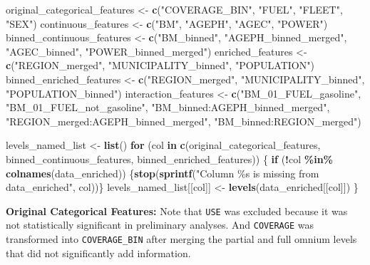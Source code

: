 \documentclass[
  english,
  11pt,
]{article}
\newenvironment{Shaded}{\begin{snugshade}}{\end{snugshade}}
\newcommand{\ControlFlowTok}[1]{\textcolor[rgb]{0.13,0.29,0.53}{\textbf{#1}}}
\newcommand{\FunctionTok}[1]{\textcolor[rgb]{0.13,0.29,0.53}{\textbf{#1}}}
\newcommand{\NormalTok}[1]{#1}
\newcommand{\OtherTok}[1]{\textcolor[rgb]{0.56,0.35,0.01}{#1}}
\newcommand{\SpecialCharTok}[1]{\textcolor[rgb]{0.81,0.36,0.00}{\textbf{#1}}}
\newcommand{\StringTok}[1]{\textcolor[rgb]{0.31,0.60,0.02}{#1}}
\begin{document}
\begin{Shaded}
\begin{Highlighting}[]
\NormalTok{original\_categorical\_features }\OtherTok{\textless{}{-}} \FunctionTok{c}\NormalTok{(}\StringTok{"COVERAGE\_BIN"}\NormalTok{, }\StringTok{"FUEL"}\NormalTok{, }\StringTok{"FLEET"}\NormalTok{, }\StringTok{"SEX"}\NormalTok{)}
\NormalTok{continuous\_features }\OtherTok{\textless{}{-}} \FunctionTok{c}\NormalTok{(}\StringTok{"BM"}\NormalTok{, }\StringTok{"AGEPH"}\NormalTok{, }\StringTok{"AGEC"}\NormalTok{, }\StringTok{"POWER"}\NormalTok{)}
\NormalTok{binned\_continuous\_features }\OtherTok{\textless{}{-}} \FunctionTok{c}\NormalTok{(}\StringTok{"BM\_binned"}\NormalTok{, }\StringTok{"AGEPH\_binned\_merged"}\NormalTok{, }\StringTok{"AGEC\_binned"}\NormalTok{, }\StringTok{"POWER\_binned\_merged"}\NormalTok{)}
\NormalTok{enriched\_features }\OtherTok{\textless{}{-}} \FunctionTok{c}\NormalTok{(}\StringTok{"REGION\_merged"}\NormalTok{, }\StringTok{"MUNICIPALITY\_binned"}\NormalTok{, }\StringTok{"POPULATION"}\NormalTok{)}
\NormalTok{binned\_enriched\_features }\OtherTok{\textless{}{-}} \FunctionTok{c}\NormalTok{(}\StringTok{"REGION\_merged"}\NormalTok{, }\StringTok{"MUNICIPALITY\_binned"}\NormalTok{, }\StringTok{"POPULATION\_binned"}\NormalTok{)}
\NormalTok{interaction\_features }\OtherTok{\textless{}{-}} \FunctionTok{c}\NormalTok{(}\StringTok{"BM\_01\_FUEL\_gasoline"}\NormalTok{, }\StringTok{"BM\_01\_FUEL\_not\_gasoline"}\NormalTok{, }\StringTok{"BM\_binned:AGEPH\_binned\_merged"}\NormalTok{, }\StringTok{"REGION\_merged:AGEPH\_binned\_merged"}\NormalTok{, }\StringTok{"BM\_binned:REGION\_merged"}\NormalTok{)}

\NormalTok{levels\_named\_list }\OtherTok{\textless{}{-}} \FunctionTok{list}\NormalTok{()}
\ControlFlowTok{for}\NormalTok{ (col }\ControlFlowTok{in} \FunctionTok{c}\NormalTok{(original\_categorical\_features, binned\_continuous\_features, binned\_enriched\_features)) \{}
    \ControlFlowTok{if}\NormalTok{ (}\SpecialCharTok{!}\NormalTok{col }\SpecialCharTok{\%in\%} \FunctionTok{colnames}\NormalTok{(data\_enriched)) \{}\FunctionTok{stop}\NormalTok{(}\FunctionTok{sprintf}\NormalTok{(}\StringTok{"Column \%s is missing from data\_enriched"}\NormalTok{, col))\}}
\NormalTok{    levels\_named\_list[[col]] }\OtherTok{\textless{}{-}} \FunctionTok{levels}\NormalTok{(data\_enriched[[col]])}
\NormalTok{\}}
\end{Highlighting}
\end{Shaded}

\textbf{Original Categorical Features:} Note that \texttt{USE} was
excluded because it was not statistically significant in preliminary
analyses. And \texttt{COVERAGE} was transformed into
\texttt{COVERAGE\_BIN} after merging the partial and full omnium levels
that did not significantly add information.
\end{document}
